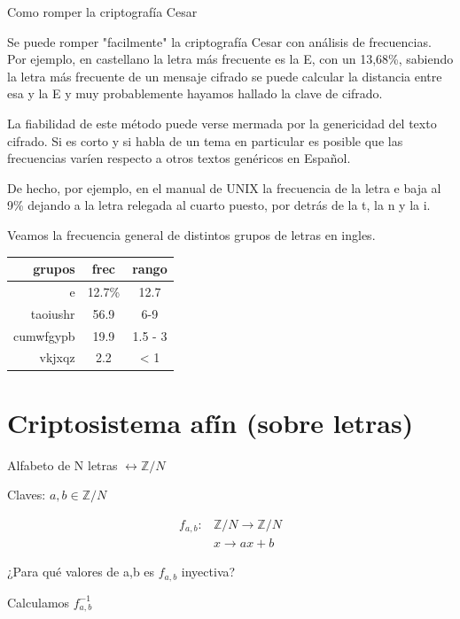 		\vspace{1.5cm}

		\begin{example}{Como romper la criptografía Cesar}
		
			Se puede romper "facilmente" la criptografía Cesar con análisis de frecuencias. Por ejemplo, en castellano la letra más frecuente es la E, con un 13,68\%, sabiendo la letra más frecuente de un mensaje cifrado se puede calcular la distancia entre esa y la E y muy probablemente hayamos hallado la clave de cifrado.

			La fiabilidad de este método puede verse mermada por la genericidad del texto cifrado. Si es corto y si habla de un tema en particular es posible que las frecuencias varíen respecto a otros textos genéricos en Español.

			De hecho, por ejemplo, en el manual de UNIX la frecuencia de la letra e baja al 9\% dejando a la letra relegada al cuarto puesto, por detrás de la t, la n y la i.

		\end{example}


		Veamos la frecuencia general de distintos grupos de letras en ingles.

		\begin{tabular}[h]{r|c|c}
			\textbf{grupos} & \textbf{frec} & \textbf{rango} \\ \hline
			e & 12.7\% & 12.7 \\
			taoiushr & 56.9 & 6-9 \\
			cumwfgypb & 19.9 & 1.5 - 3 \\
			vkjxqz & 2.2 & < 1
		\end{tabular}

		\section{Criptosistema afín (sobre letras)}

			Alfabeto de N letras $\leftrightarrow \mathbb{Z}/N$

			Claves: $a,b \in \mathbb{Z}/N$

			\begin{align*}
				f_{a,b} :&  \mathbb{Z}/N\to \mathbb{Z}/N\\
				& x \rightarrow ax + b
			\end{align*}

			¿Para qué valores de a,b es $f_{a,b}$ inyectiva?

			Calculamos $f^{-1}_{a,b}$

